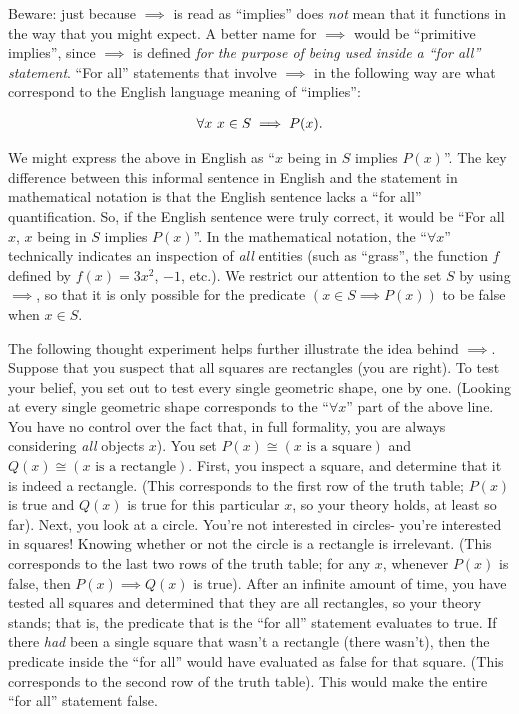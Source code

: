 Beware: just because $\implies$ is read as ``implies'' does \textit{not} mean that it functions in the way that you might expect. A better name for $\implies$ would be ``primitive implies'', since $\implies$ is defined \textit{for the purpose of being used inside a ``for all'' statement}. ``For all'' statements that involve $\implies$ in the following way are what correspond to the English language meaning of ``implies'':

\begin{align*}
    \forall x \text{ } x \in S \implies P(x).
\end{align*}

We might express the above in English as ``$x$ being in $S$ implies $P(x)$''. The key difference between this informal sentence in English and the statement in mathematical notation is that the English sentence lacks a ``for all'' quantification. So, if the English sentence were truly correct, it would be ``For all $x$, $x$ being in $S$ implies $P(x)$''. In the mathematical notation, the ``$\forall x$'' technically indicates an inspection of \textit{all} entities (such as ``grass'', the function $f$ defined by $f(x) = 3x^2$, $-1$, etc.). We restrict our attention to the set $S$ by using $\implies$, so that it is only possible for the predicate $(x \in S \implies P(x))$ to be false when $x \in S$.

The following thought experiment helps further illustrate the idea behind $\implies$. Suppose that you suspect that all squares are rectangles (you are right). To test your belief, you set out to test every single geometric shape, one by one. (Looking at every single geometric shape corresponds to the ``$\forall x$'' part of the above line. You have no control over the fact that, in full formality, you are always considering \textit{all} objects $x$). You set $P(x) \cong (\text{$x$ is a square})$ and $Q(x) \cong (\text{$x$ is a rectangle})$. First, you inspect a square, and determine that it is indeed a rectangle. (This corresponds to the first row of the truth table; $P(x)$ is true and $Q(x)$ is true for this particular $x$, so your theory holds, at least so far). Next, you look at a circle. You're not interested in circles- you're interested in squares! Knowing whether or not the circle is a rectangle is irrelevant. (This corresponds to the last two rows of the truth table; for any $x$, whenever $P(x)$ is false, then $P(x) \implies Q(x)$ is true). After an infinite amount of time, you have tested all squares and determined that they are all rectangles, so your theory stands; that is, the predicate that is the ``for all'' statement evaluates to true. If there \textit{had} been a single square that wasn't a rectangle (there wasn't), then the predicate inside the ``for all'' would have evaluated as false for that square. (This corresponds to the second row of the truth table). This would make the entire ``for all'' statement false.

